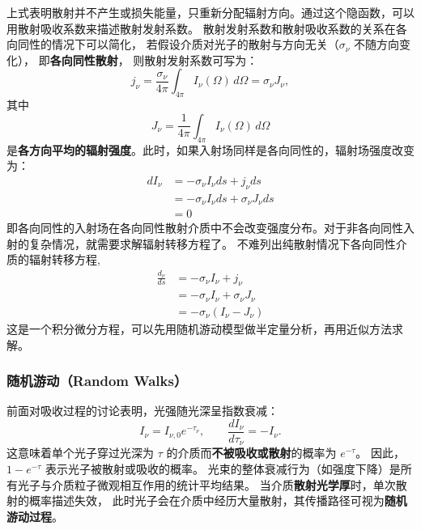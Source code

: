 
上式表明散射并不产生或损失能量，只重新分配辐射方向。通过这个隐函数，可以用散射吸收系数来描述散射发射系数。
散射发射系数和散射吸收系数的关系在各向同性的情况下可以简化，
若假设介质对光子的散射与方向无关（$\sigma_\nu$ 不随方向变化），
即\textbf{各向同性散射}，
则散射发射系数可写为：
\[
j_\nu = \frac{\sigma_\nu}{4\pi} \int_{4\pi} I_\nu(\Omega)\, d\Omega
      = \sigma_\nu J_\nu,
\]
其中
\[
J_\nu = \frac{1}{4\pi}\int_{4\pi} I_\nu(\Omega)\, d\Omega
\]
是\textbf{各方向平均的辐射强度}。此时，如果入射场同样是各向同性的，辐射场强度改变为：
\begin{align}
  dI_\nu &= -\sigma_\nu I_\nu ds + j_\nu ds \nonumber \\
         &= -\sigma_\nu I_\nu ds + \sigma_\nu J_\nu ds \nonumber\\
         &=0
\end{align}
即各向同性的入射场在各向同性散射介质中不会改变强度分布。对于非各向同性入射的复杂情况，就需要求解辐射转移方程了。
不难列出纯散射情况下各向同性介质的辐射转移方程,
\begin{align}
  \frac{d_\nu}{ds} &= -\sigma_\nu I_\nu +j_\nu \nonumber\\
  &= -\sigma_\nu I_\nu + \sigma_\nu J_\nu \nonumber\\
  &= -\sigma_\nu (I_\nu - J_\nu)
\end{align}
这是一个积分微分方程，可以先用随机游动模型做半定量分析，再用近似方法求解。
\subsubsection{随机游动（Random Walks）}


前面对吸收过程的讨论表明，光强随光深呈指数衰减：
\[
I_\nu = I_{\nu,0} e^{-\tau_\nu}, \qquad \frac{dI_\nu}{d\tau_\nu} = -I_\nu.
\]
这意味着单个光子穿过光深为 $\tau$ 的介质而\textbf{不被吸收或散射}的概率为 $e^{-\tau}$。
因此，$1-e^{-\tau}$ 表示光子被散射或吸收的概率。
光束的整体衰减行为（如强度下降）是所有光子与介质粒子微观相互作用的统计平均结果。  
当介质\textbf{散射光学厚}时，单次散射的概率描述失效，
此时光子会在介质中经历大量散射，其传播路径可视为\textbf{随机游动过程}。

